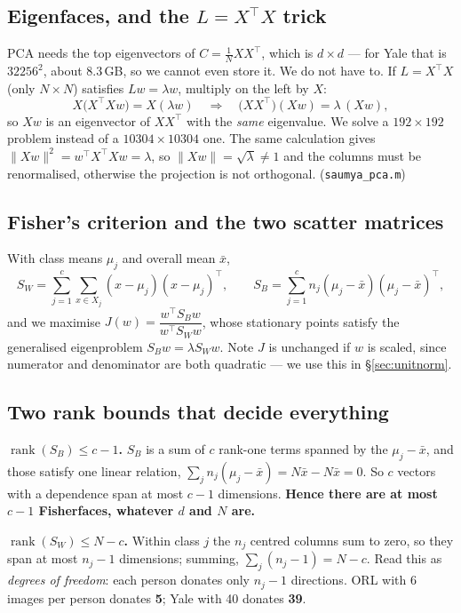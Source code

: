 \documentclass[11pt]{article}
\newcommand{\Sw}{S_W}
\newcommand{\Sb}{S_B}
\newcommand{\rank}{\operatorname{rank}}
\begin{document}
\subsection{Eigenfaces, and the \texorpdfstring{$L=X^{\!\top}\!X$}{L = X'X} trick}

PCA needs the top eigenvectors of $C=\tfrac1N XX^{\!\top}$, which is
$d\times d$ --- for Yale that is $32256^2$, about 8.3\,GB, so we cannot even
store it. We do not have to. If $L=X^{\!\top}\!X$ (only $N\times N$) satisfies
$Lw=\lambda w$, multiply on the left by $X$:
\[
  X\big(X^{\!\top}\!Xw\big)=X(\lambda w)
  \quad\Longrightarrow\quad
  \big(XX^{\!\top}\big)(Xw)=\lambda\,(Xw),
\]
so $Xw$ is an eigenvector of $XX^{\!\top}$ with the \emph{same} eigenvalue.
We solve a $192\times192$ problem instead of a $10304\times10304$ one. The same
calculation gives $\|Xw\|^2=w^{\!\top}X^{\!\top}\!Xw=\lambda$, so
$\|Xw\|=\sqrt{\lambda}\neq1$ and the columns must be renormalised, otherwise
the projection is not orthogonal. (\texttt{saumya\_pca.m})

\subsection{Fisher's criterion and the two scatter matrices}

With class means $\mu_j$ and overall mean $\bar{x}$,
\[
  \Sw=\sum_{j=1}^{c}\sum_{x\in X_j}(x-\mu_j)(x-\mu_j)^{\!\top},
  \qquad
  \Sb=\sum_{j=1}^{c}n_j(\mu_j-\bar{x})(\mu_j-\bar{x})^{\!\top},
\]
and we maximise $J(w)=\dfrac{w^{\!\top}\Sb w}{w^{\!\top}\Sw w}$, whose
stationary points satisfy the generalised eigenproblem $\Sb w=\lambda\Sw w$.
Note $J$ is unchanged if $w$ is scaled, since numerator and denominator are
both quadratic --- we use this in \S\ref{sec:unitnorm}.

\subsection{Two rank bounds that decide everything}

\textbf{$\rank(\Sb)\le c-1$.} $\Sb$ is a sum of $c$ rank-one terms spanned by
the $\mu_j-\bar{x}$, and those satisfy one linear relation,
$\sum_j n_j(\mu_j-\bar{x})=N\bar{x}-N\bar{x}=0$. So $c$ vectors with a
dependence span at most $c-1$ dimensions. \textbf{Hence there are at most
$c-1$ Fisherfaces, whatever $d$ and $N$ are.}

\textbf{$\rank(\Sw)\le N-c$.} Within class $j$ the $n_j$ centred columns sum to
zero, so they span at most $n_j-1$ dimensions; summing,
$\sum_j(n_j-1)=N-c$. Read this as \emph{degrees of freedom}: each person
donates only $n_j-1$ directions. ORL with 6 images per person donates
\textbf{5}; Yale with 40 donates \textbf{39}.
\end{document}
